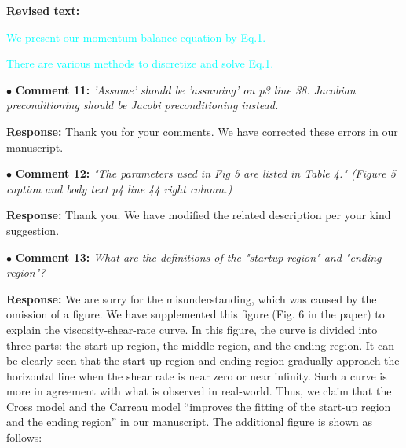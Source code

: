 \documentclass[12pt,a4paper]{article}
\newcommand{\revised}[1]{\textcolor{cyan}{#1}}
\begin{document}
\vspace{0.2cm}
\textbf{Revised text:}

\revised{We present our momentum balance equation by Eq.1.}

\revised{There are various methods to discretize and solve Eq.1.}




\vspace{0.4cm}
\noindent$\bullet$ \enspace \textbf{Comment 11:}
\textit{'Assume' should be 'assuming' on p3 line 38. Jacobian preconditioning should be Jacobi preconditioning instead.}

\vspace{0.2cm}
\textbf{Response:}
Thank you for your comments. We have corrected these errors in our manuscript.




\vspace{0.4cm}
\noindent$\bullet$ \enspace \textbf{Comment 12:}
\textit{"The parameters used in Fig 5 are listed in Table 4." (Figure 5 caption and body text p4 line 44 right column.) }

\vspace{0.2cm}
\textbf{Response:}
Thank you. We have modified the related description per your kind suggestion.



\vspace{0.4cm}
\noindent$\bullet$ \enspace \textbf{Comment 13:}
\textit{What are the definitions of the "startup region" and "ending region"?}

\vspace{0.2cm}
\textbf{Response:}
We are sorry for the misunderstanding, which was caused by the omission of a figure. We have supplemented this figure (Fig. 6 in the paper) to explain the viscosity-shear-rate curve. In this figure, the curve is divided into three parts: the start-up region, the middle region, and the ending region. It can be clearly seen that the start-up region and ending region gradually approach the horizontal line when the shear rate is near zero or near infinity. Such a curve is more in agreement with what is observed in real-world. Thus, we claim that the Cross model and the Carreau model “improves the fitting of the start-up region and the ending region” in our manuscript. The additional figure is shown as follows:
\end{document}

